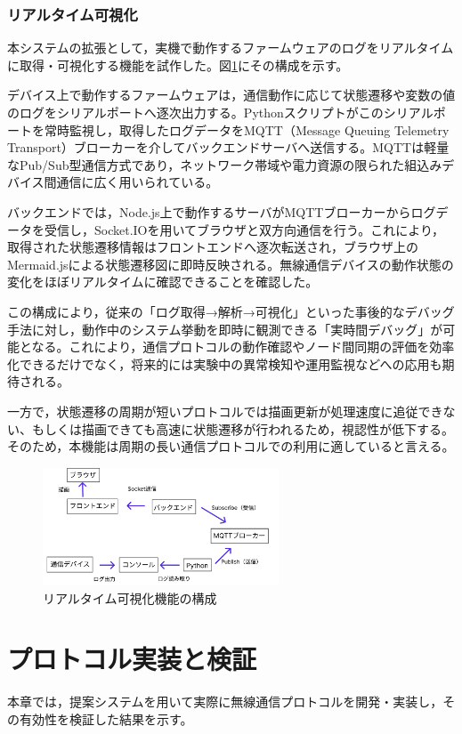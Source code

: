 \documentclass[technicalreport]{ieicej}
\begin{document}
\subsubsection{リアルタイム可視化}
本システムの拡張として，実機で動作するファームウェアのログをリアルタイムに取得・可視化する機能を試作した。図\ref{fig:realtime-structure}にその構成を示す。

デバイス上で動作するファームウェアは，通信動作に応じて状態遷移や変数の値のログをシリアルポートへ逐次出力する。Pythonスクリプトがこのシリアルポートを常時監視し，取得したログデータをMQTT（Message Queuing Telemetry Transport）ブローカーを介してバックエンドサーバへ送信する。MQTTは軽量なPub/Sub型通信方式であり，ネットワーク帯域や電力資源の限られた組込みデバイス間通信に広く用いられている\cite{MQTT}。

バックエンドでは，Node.js上で動作するサーバがMQTTブローカーからログデータを受信し，Socket.IOを用いてブラウザと双方向通信を行う。これにより，取得された状態遷移情報はフロントエンドへ逐次転送され，ブラウザ上のMermaid.jsによる状態遷移図に即時反映される。無線通信デバイスの動作状態の変化をほぼリアルタイムに確認できることを確認した。

この構成により，従来の「ログ取得→解析→可視化」といった事後的なデバッグ手法に対し，動作中のシステム挙動を即時に観測できる「実時間デバッグ」が可能となる。これにより，通信プロトコルの動作確認やノード間同期の評価を効率化できるだけでなく，将来的には実験中の異常検知や運用監視などへの応用も期待される。

一方で，状態遷移の周期が短いプロトコルでは描画更新が処理速度に追従できない、もしくは描画できても高速に状態遷移が行われるため，視認性が低下する。そのため，本機能は周期の長い通信プロトコルでの利用に適していると言える。

\begin{figure}[h]
\centering
\includegraphics[width=70mm]{./images/realtime.pdf}
\caption{リアルタイム可視化機能の構成}
\label{fig:realtime-structure}
\end{figure}

\section{プロトコル実装と検証}
本章では，提案システムを用いて実際に無線通信プロトコルを開発・実装し，その有効性を検証した結果を示す。
\end{document}
